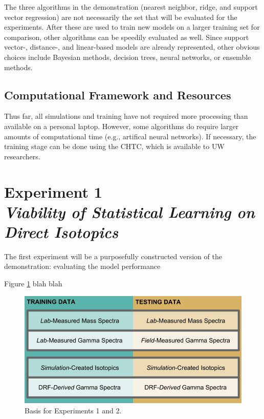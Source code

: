 The three algorithms in the demonstration (nearest neighbor, ridge, and support
vector regression) are not necessarily the set that will be evaluated for the
experiments. After these are used to train new models on a larger training set
for comparison, other algorithms can be speedily evaluated as well.  Since
support vector-, distance-, and linear-based models are already represented,
other obvious choices include Bayesian methods, decision trees, neural
networks, or ensemble methods. 

\subsection*{Computational Framework and Resources}

Thus far, all simulations and training have not required more processing than
available on a personal laptop. However, some algorithms do require larger
amounts of computational time (e.g., artifical neural networks).  If necessary,
the training stage can be done using the \gls{CHTC}, which is available to
\gls{UW} researchers. 

\section[Experiment 1: Direct Isotopics]{Experiment 1\\ \large{\textit{Viability of Statistical Learning on Direct Isotopics}}}
\label{sec:exp1}

The first experiment will be a purposefully constructed version of the 
demonstration: evaluating the model performance  

Figure \ref{fig:proposal} blah blah

\begin{figure}[!htb]
    \centering
    \includegraphics[width=\linewidth]{./chapters/proposal/proposal.png}
    \caption{Basis for Experiments 1 and 2.}
    \label{fig:proposal}
\end{figure}


